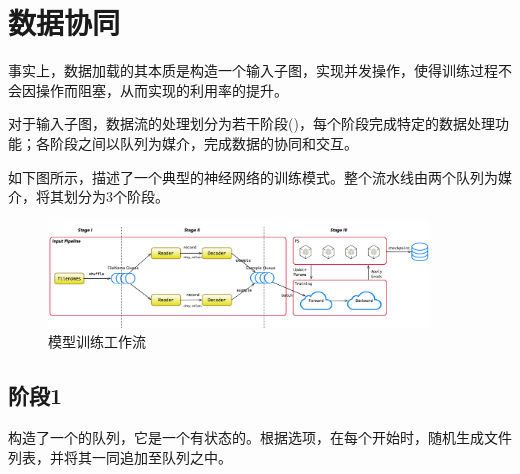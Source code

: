 \section{数据协同}

\begin{content}

事实上，数据加载的其本质是构造一个输入子图，实现并发操作，使得训练过程不会因操作而阻塞，从而实现的利用率的提升。

对于输入子图，数据流的处理划分为若干阶段()，每个阶段完成特定的数据处理功能；各阶段之间以队列为媒介，完成数据的协同和交互。

如下图所示，描述了一个典型的神经网络的训练模式。整个流水线由两个队列为媒介，将其划分为3个阶段。

\begin{figure}[!htbp]
\centering
\includegraphics[width=0.9\textwidth]{figures/tf-input-pipeline.png}
\caption{模型训练工作流}
 \label{fig:tf-input-pipeline}
\end{figure}

\subsection{阶段1}

构造了一个的队列，它是一个有状态的。根据选项，在每个开始时，随机生成文件列表，并将其一同追加至队列之中。


\end{content}
